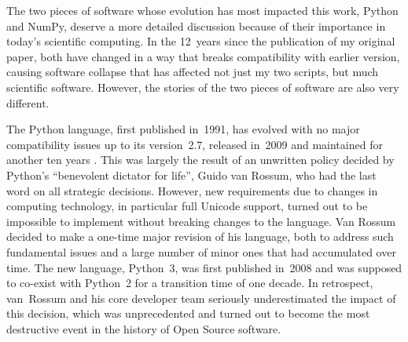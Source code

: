 
\vspace{3mm}

The two pieces of software whose evolution has most impacted this work, Python and NumPy, deserve a more detailed discussion because of their importance in today's scientific computing. In the 12~years since the publication of my original paper, both have changed in a way that breaks compatibility with earlier version, causing software collapse \cite{HinsenDealingSoftwareCollapse2019} that has affected not just my two scripts, but much scientific software. However, the stories of the two pieces of software are also very different.

\vspace{1mm}

The Python language, first published in~1991, has evolved with no major compatibility issues up to its version~2.7, released in~2009 and maintained for another ten years \cite{WikipediacommunityHistoryPython2020}. This was largely the result of an unwritten policy decided by Python's ``benevolent dictator for life'', Guido van Rossum, who had the last word on all strategic decisions. However, new requirements due to changes in computing technology, in particular full Unicode support, turned out to be impossible to implement without breaking changes to the language. Van Rossum decided to make a one-time major revision of his language, both to address such fundamental issues and a large number of minor ones that had accumulated over time. The new language, Python~3, was first published in~2008 and was supposed to co-exist with Python~2 for a transition time of one decade. In retrospect, van~Rossum and his core developer team seriously underestimated the impact of this decision, which was unprecedented and turned out to become the most destructive event in the history of Open Source software.

